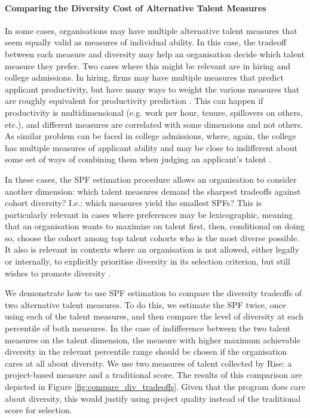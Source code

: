 \paragraph{Comparing the Diversity Cost of Alternative Talent Measures} In some cases, organisations may have multiple alternative talent measures that seem equally valid as measures of individual ability. In this case, the tradeoff between each measure and diversity may help an organisation decide which talent measure they prefer.  Two cases where this might be relevant are in hiring and college admissions. In hiring, firms may have multiple measures that predict applicant productivity, but have many ways to weight the various measures that are roughly equivalent for productivity prediction \cite{hartigan_fairness_1989}. This can happen if productivity is multidimensional (e.g. work per hour, tenure, spillovers on others, etc.), and different measures are correlated with some dimensions and not others. As similar problem can be faced in college admissions, where, again, the college has multiple measures of applicant ability and may be close to indifferent about some set of ways of combining them when judging an applicant's talent \cite{tam2002new}. 

In these cases, the SPF estimation procedure allows an organisation to consider another dimension: which talent measures demand the sharpest tradeoffs against cohort diversity? I.e.: which measures yield the smallest SPFs? This is particularly relevant in cases where preferences may be lexicographic, meaning that an organisation wants to maximize on talent first, then, conditional on doing so, choose the cohort among top talent cohorts who is the most diverse possible. It also is relevant in contexts where an organisation is not allowed, either legally or internally, to explicitly prioritise diversity in its selection criterion, but still wishes to promote diversity \cite{Bleemer_2023}. 

We demonstrate how to use SPF estimation to compare the diversity tradeoffs of two alternative talent measures. To do this, we estimate the SPF twice, once using each of the talent measures, and then compare the level of diversity at each percentile of both measures. In the case of indifference between the two talent measures on the talent dimension, the measure with higher maximum achievable diversity in the relevant percentile range should be chosen if the organisation cares at all about diversity. We use two measures of talent collected by Rise: a project-based measure and a traditional score. The results of this comparison are depicted in Figure \ref{fig:compare_div_tradeoffs}. Given that the program does care about diversity, this would justify using project quality instead of the traditional score for selection. 

